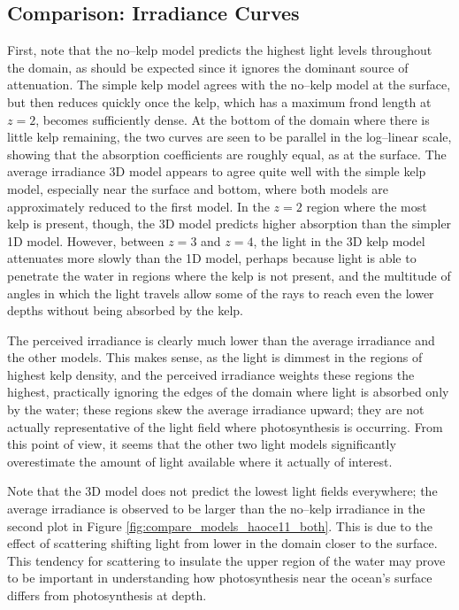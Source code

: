 \subsection{Comparison: Irradiance Curves}
First, note that the no--kelp model predicts the highest light levels throughout the domain, as should be expected since it ignores the dominant source of attenuation.
The simple kelp model agrees with the no--kelp model at the surface, but then reduces quickly once the kelp, which has a maximum frond length at $z=2$, becomes sufficiently dense.
At the bottom of the domain where there is little kelp remaining, the two curves are seen to be parallel in the log--linear scale, showing that the absorption coefficients are roughly equal, as at the surface.
The average irradiance 3D model appears to agree quite well with the simple kelp model, especially near the surface and bottom, where both models are approximately reduced to the first model.
In the $z=2$ region where the most kelp is present, though, the 3D model predicts higher absorption than the simpler 1D model.
However, between $z=3$ and $z=4$, the light in the 3D kelp model attenuates more slowly than the 1D model, perhaps because light is able to penetrate the water in regions where the kelp is not present, and the multitude of angles in which the light travels allow some of the rays to reach even the lower depths without being absorbed by the kelp.

The perceived irradiance is clearly much lower than the average irradiance and the other models.
This makes sense, as the light is dimmest in the regions of highest kelp density, and the perceived irradiance weights these regions the highest, practically ignoring the edges of the domain where light is absorbed only by the water; these regions skew the average irradiance upward; they are not actually representative of the light field where photosynthesis is occurring.
From this point of view, it seems that the other two light models significantly overestimate the amount of light available where it actually of interest.

Note that the 3D model does not predict the lowest light fields everywhere; the average irradiance is observed to be larger than the no--kelp irradiance in the second plot in Figure \ref{fig:compare_models_haoce11_both}.
This is due to the effect of scattering shifting light from lower in the domain closer to the surface.
This tendency for scattering to insulate the upper region of the water may prove to be important in understanding how photosynthesis near the ocean's surface differs from photosynthesis at depth.

